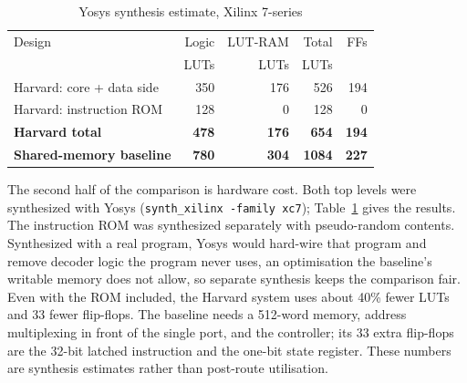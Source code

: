 \documentclass[conference]{IEEEtran}
\begin{document}
\begin{table}[t]
  \caption{Yosys synthesis estimate, Xilinx 7-series}
  \label{tab:synth}
  \centering
  \setlength{\tabcolsep}{3pt}
  \begin{tabular}{@{}lrrrr@{}}
    \toprule
    Design & Logic & LUT-RAM & Total & FFs \\
    & LUTs & LUTs & LUTs & \\
    \midrule
    Harvard: core + data side & 350 & 176 & 526 & 194 \\
    Harvard: instruction ROM  & 128 &   0 & 128 &   0 \\
    \textbf{Harvard total}    & \textbf{478} & \textbf{176} & \textbf{654} & \textbf{194} \\
    \textbf{Shared-memory baseline} & \textbf{780} & \textbf{304} & \textbf{1084} & \textbf{227} \\
    \bottomrule
  \end{tabular}
\end{table}

The second half of the comparison is hardware cost. Both top levels were synthesized with Yosys
\cite{yosys} (\texttt{synth\_xilinx -family xc7}); Table~\ref{tab:synth} gives the results. The
instruction ROM was synthesized separately with pseudo-random contents. Synthesized with a real
program, Yosys would hard-wire that program and remove decoder logic the program never uses, an
optimisation the baseline's writable memory does not allow, so separate synthesis keeps the
comparison fair. Even with the ROM included, the Harvard system uses about 40\% fewer LUTs
and 33 fewer flip-flops. The baseline needs a 512-word memory, address multiplexing in front of
the single port, and the controller; its 33 extra flip-flops are the 32-bit latched instruction
and the one-bit state register. These numbers are synthesis estimates rather than post-route
utilisation.
\end{document}
